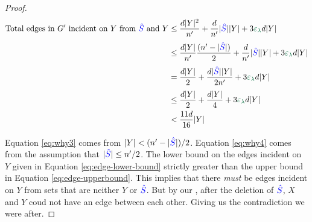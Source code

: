 \documentclass[11pt]{article}
\begin{document}
\begin{proof}
\begin{align}
 \text{Total edges in $\RemGraph$ incident on $Y$ from $\BadSet$ and $Y$} &\leq \frac{d\Size{Y}^2}{\SizeRemGraph} +   \frac{d}{\SizeRemGraph}\Size{\BadSet}\Size{Y} + 3\epsilonL d\Size{Y}\\[3pt]                                                                          &\leq  \frac{d\Size{Y}}{\SizeRemGraph}\frac{(\SizeRemGraph - \Size{\BadSet})}{2} + \frac{d}{\SizeRemGraph}\Size{\BadSet}\Size{Y} + 3\epsilonL d\Size{Y} \label{eq:why3}\\[3pt]
                                                                          &= \frac{d\Size{Y}}{2} + \frac{d\Size{\BadSet}\Size{Y}}{2\SizeRemGraph} +3\epsilonL d\Size{Y}\\[3pt]
                                                                          &\leq \frac{d\Size{Y}}{2} + \frac{d\Size{Y}}{4} +3\epsilonL d\Size{Y}  \label{eq:why4}\\
                                                                            &< \frac{11d}{16}\Size{Y} \label{eq:edge-upperbound}
\end{align}

Equation \eqref{eq:why3} comes from  $|Y| < (n' - |\textcolor{blue}{\hat{S}}|)/2$.
Equation \eqref{eq:why4} comes from the assumption that $|\textcolor{blue}{\hat{S}}| \leq n'/2$.
The lower bound on the edges incident on $Y$ given in Equation \eqref{eq:edge-lower-bound} strictly greater than the upper bound in Equation \eqref{eq:edge-upperbound}.
This implies that there \emph{must} be edges incident on $Y$ from sets that are neither $Y$ or $\textcolor{blue}{\hat{S}}$.
But by our , after the deletion of $\textcolor{blue}{\hat{S}}$, $X$ and $Y$ coud not have an edge between each other.
Giving us the contradiction we were after.

\end{proof}
\end{document}
